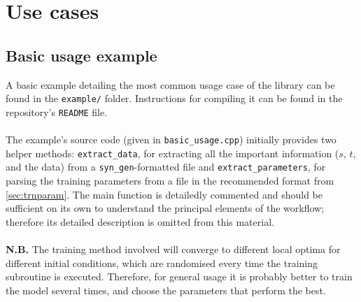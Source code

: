 \documentclass[12pt,openany]{article}
\begin{document}
	\section{Use cases}
	\subsection{Basic usage example}\label{sec:basic}
	A basic example detailing the most common usage case of the library can be found in the {\tt example/} folder. Instructions for compiling it can be found in the repository's {\tt README} file.\\ \\ 
	The example's source code (given in {\tt basic\_usage.cpp}) initially provides two helper methods: {\tt extract\_data}, for extracting all the important information ($s$, $t$, and the data) from a {\tt syn\_gen}-formatted file and {\tt extract\_parameters}, for parsing the training parameters from a file in the recommended format from \cref{sec:trnparam}. The main function is detailedly commented and should be sufficient on its own to understand the principal elements of the workflow; therefore its detailed description is omitted from this material.\\ \\
	{\bf N.B.} The training method involved will converge to different local optima for different initial conditions, which are randomised every time the training subroutine is executed. Therefore, for general usage it is probably better to train the model several times, and choose the parameters that perform the best.
\end{document}
